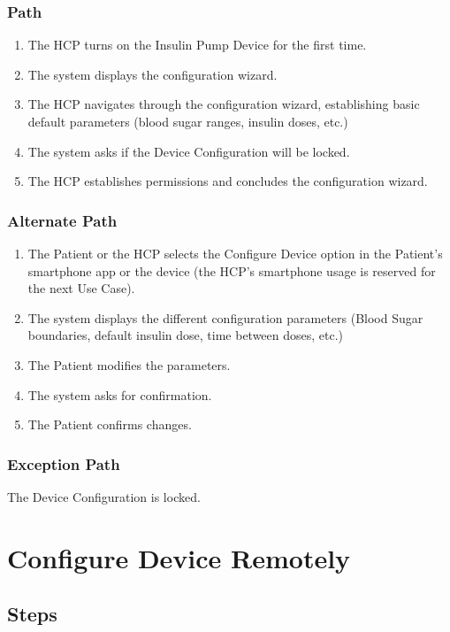 \documentclass{scrreprt}
\begin{document}
    \subsubsection{Path}
        \begin{enumerate}
            \item The HCP turns on the Insulin Pump Device for the first time.
            \item The system displays the configuration wizard.  
            \item The HCP navigates through the configuration wizard, establishing basic default parameters (blood sugar ranges, insulin doses, etc.) 
            \item The system asks if the Device Configuration will be locked. 
            \item The HCP establishes permissions and concludes the configuration wizard.
        \end{enumerate}
    \subsubsection{Alternate Path}
        \begin{enumerate}
            \item The Patient or the HCP selects the Configure Device option in the Patient's smartphone app or the device (the HCP's smartphone usage is reserved for the next Use Case). 
            \item The system displays the different configuration parameters (Blood Sugar boundaries, default insulin dose, time between doses, etc.)   
            \item The Patient modifies the parameters.
            \item The system asks for confirmation.
            \item The Patient confirms changes.
        \end{enumerate}
    \subsubsection{Exception Path}
        The Device Configuration is locked.

\section{Configure Device Remotely}
\subsection{Steps}
\end{document}
